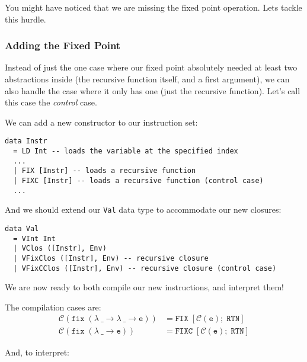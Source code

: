 You might have noticed that we are missing the fixed point operation. Lets tackle this hurdle.

\subsubsection{Adding the Fixed Point}

Instead of just the one case where our fixed point absolutely needed at least two abstractions inside (the recursive function itself, and a first argument), 
we can also handle the case where it only has one (just the recursive function). Let's call this case the \textit{control} case.

We can add a new constructor to our instruction set:
\begin{lstlisting}
data Instr
  = LD Int -- loads the variable at the specified index 
  ...
  | FIX [Instr] -- loads a recursive function
  | FIXC [Instr] -- loads a recursive function (control case)
  ...
\end{lstlisting}

And we should extend our \texttt{Val} data type to accommodate our new closures:

\begin{lstlisting}
data Val
  = VInt Int
  | VClos ([Instr], Env)
  | VFixClos ([Instr], Env) -- recursive closure
  | VFixCClos ([Instr], Env) -- recursive closure (control case)
\end{lstlisting}

We are now ready to both compile our new instructions, and interpret them!

The compilation cases are:
\[
\begin{aligned}
  \mathcal{C}(\mathtt{fix\; (\lambda \ \_ \to \lambda \ \_ \to e)}) & = \mathtt{FIX}\; [\mathcal{C}(\mathtt{e});\; \mathtt{RTN}] \\
  \mathcal{C}(\mathtt{fix\; (\lambda \ \_ \to e)}) & = \mathtt{FIXC}\; [\mathcal{C}(\mathtt{e});\; \mathtt{RTN}]
\end{aligned}
\]

And, to interpret:

